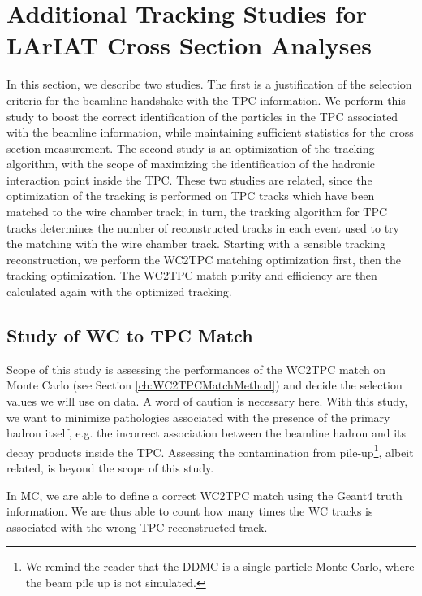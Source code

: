 \chapter{Additional Tracking Studies for LArIAT Cross Section Analyses}\label{ch:AppendixTrack}
In this section, we describe two studies. The first is a justification of the selection criteria for the beamline handshake with the TPC information.  We perform this study to boost  the correct identification of the particles in the TPC associated with the beamline information, while maintaining sufficient statistics for the cross section measurement.  The second study is an optimization of the tracking algorithm, with the scope of maximizing the identification of the hadronic interaction point inside the TPC.  These two studies are related, since the optimization of the tracking is performed on TPC tracks which have been matched to the wire chamber track; in turn, the tracking algorithm for TPC tracks determines the number of reconstructed tracks in each event used to try the matching with the wire chamber track. Starting with a sensible tracking reconstruction, we perform the WC2TPC matching optimization first, then the tracking optimization. The WC2TPC match purity and efficiency  are then calculated again with the optimized tracking.


\section{Study of WC to TPC Match}



Scope of this study is assessing the performances of the WC2TPC match on Monte Carlo (see Section \ref{ch:WC2TPCMatchMethod}) and decide the selection values we will use on data. A word of caution is necessary here. With this study, we want to minimize pathologies associated with the presence of the primary hadron itself, e.g. the incorrect association between the beamline hadron and its decay products inside the TPC.  Assessing the contamination from pile-up\footnote{We remind the reader that the DDMC is a single particle Monte Carlo, where the beam pile up is not simulated.}, albeit related, is beyond the scope of this study.

In MC, we are able to define a correct WC2TPC match using the Geant4 truth information. We are thus able to count how many times the WC tracks is associated with the wrong TPC reconstructed track. 


